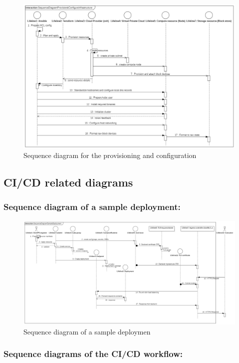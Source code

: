\begin{figure}[H]\centering
\includegraphics[width=1.0\textwidth,angle=00]{assets/f3.jpg}
\caption{Sequence diagram for the provisioning and configuration}
\label{fig:f3}
\end{figure}

\subsection{CI/CD related diagrams}

\subsubsection{Sequence diagram of a sample deployment: }

\begin{figure}[H]\centering
\includegraphics[width=1.0\textwidth,angle=00]{assets/f4.jpg}
\caption{Sequence diagram of a sample deploymen}
\label{fig:f4}
\end{figure}


\subsubsection{Sequence diagrams of the CI/CD workflow: }

